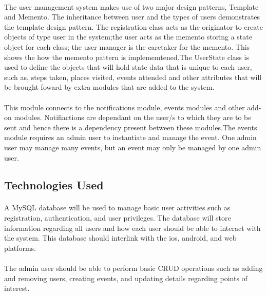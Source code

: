 \documentclass{article}
\begin{document}
\paragraph{}The user management system makes use of two major design patterns, Template and Memento. The inheritance between user and the types of users demonstrates the template design pattern. The registration class acts as the originator to create objects of type user in the system;the user acts as the memento storing a state object for each class; the user manager is the caretaker for the memento. This shows the how the memento pattern is implememtened.The UserState class is used to define the objects that will hold state data that is unique to each user, such as, steps taken, places visited, events attended and other attributes that will be brought foward by extra modules that are added to the system.

\paragraph{}This module connects to the notifications module, events modules and other add-on modules. Notifiactions are dependant on the user/s to which they are to be sent and hence there is a dependency present between these modules.The events module requires an admin user to instantiate and manage the event. One admin user may manage many events, but an event may only be managed by one admin user. 

\subsection{Technologies Used}
\paragraph{}A MySQL database will be used to manage basic user activities such as registration, authentication, and user privileges. The database will store information regarding all users and how each user should be able to interact with the system. This database should interlink with the ios, android, and web platforms.

\paragraph{}The admin user should be able to perform basic CRUD operations such as adding and removing users, creating events, and updating details regarding points of interest. 
\end{document}
